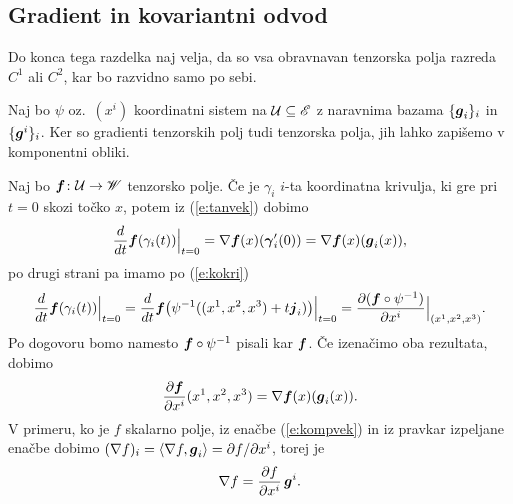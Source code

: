 \subsection{Gradient in kovariantni odvod}


Do konca tega razdelka naj velja, da so vsa obravnavan tenzorska polja razreda
$C^{1}$ ali $C^{2}$, kar bo razvidno samo po sebi.

Naj bo $\psi$ oz.~$(x^i)$ koordinatni sistem na $\mathcal U\subseteq\mathscr E$ z naravnima bazama $\{\boldsymbol g_i\}_i$ in $\{\boldsymbol g^i\}_i$.
Ker so gradienti tenzorskih polj tudi tenzorska polja, jih lahko zapišemo v komponentni obliki.

Naj bo $\boldsymbol f\colon \mathcal U\to\mathscr W$ tenzorsko polje. Če je $\gamma_i$ $i$-ta
koordinatna krivulja, ki gre pri $t=0$ skozi točko $x$, potem iz (\ref{e:tanvek}) dobimo
\begin{equation*}
	\frac{d}{dt}\boldsymbol f(\gamma_i(t))\Big|_{t=0}=
	\nabla \boldsymbol f(x)(\boldsymbol \gamma_i'(0))=\nabla \boldsymbol f(x)(\boldsymbol g_i(x)),
\end{equation*}
po drugi strani pa imamo po (\ref{e:kokri})
\begin{equation*}
	\frac{d}{dt}\boldsymbol f(\gamma_i(t))\Big|_{t=0}=
	\frac{d}{dt}\boldsymbol f\big(\psi^{-1}((x^1,x^2,x^3)+t\boldsymbol j_i)\big)\Big|_{t=0}=
	\frac{\partial(\boldsymbol f\circ\psi^{-1})}{\partial x^i}\Big|_{(x^1,x^2,x^3)}.
\end{equation*}
Po dogovoru bomo namesto $\boldsymbol f\circ\psi^{-1}$ pisali kar $\boldsymbol f$. Če izenačimo oba rezultata, dobimo
\begin{equation} \label{e:sotf}
	\frac{\partial\boldsymbol f}{\partial x^i}(x^1,x^2,x^3)=\nabla \boldsymbol f(x)(\boldsymbol g_i(x)).
\end{equation}
V primeru, ko je $f$ skalarno polje, iz enačbe (\ref{e:kompvek}) in iz pravkar izpeljane enačbe
dobimo $(\nabla f)_i=\langle\nabla f,\boldsymbol g_i\rangle=\partial f/\partial x^i$, torej je
\begin{equation} \label{e:gradskal}
	\nabla f = \frac{\partial f}{\partial x^i}\,\boldsymbol g^i.
\end{equation}

